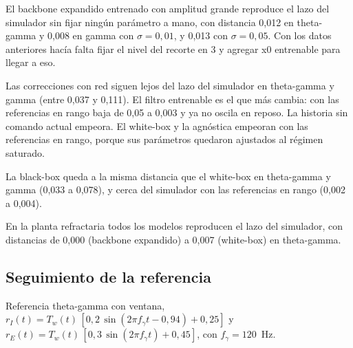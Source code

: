 \documentclass[10pt,a4paper]{article}
\begin{document}
El backbone expandido entrenado con amplitud grande reproduce el lazo del simulador sin fijar ningún parámetro a mano, con distancia 0,012 en theta-gamma y 0,008 en gamma con $\sigma = 0{,}01$, y 0,013 con $\sigma = 0{,}05$. Con los datos anteriores hacía falta fijar el nivel del recorte en 3 y agregar x0 entrenable para llegar a eso.

Las correcciones con red siguen lejos del lazo del simulador en theta-gamma y gamma (entre 0,037 y 0,111). El filtro entrenable es el que más cambia: con las referencias en rango baja de 0,05 a 0,003 y ya no oscila en reposo. La historia sin comando actual empeora. El white-box y la agnóstica empeoran con las referencias en rango, porque sus parámetros quedaron ajustados al régimen saturado.

La black-box queda a la misma distancia que el white-box en theta-gamma y gamma (0,033 a 0,078), y cerca del simulador con las referencias en rango (0,002 a 0,004).

En la planta refractaria todos los modelos reproducen el lazo del simulador, con distancias de 0,000 (backbone expandido) a 0,007 (white-box) en theta-gamma.

\subsection{Seguimiento de la referencia}

Referencia theta-gamma con ventana, $r_I(t) = T_w(t)\,[0{,}2\,\sin(2\pi f_\gamma t - 0{,}94) + 0{,}25]$ y $r_E(t) = T_w(t)\,[0{,}3\,\sin(2\pi f_\gamma t) + 0{,}45]$, con $f_\gamma = 120$~Hz.
\end{document}
